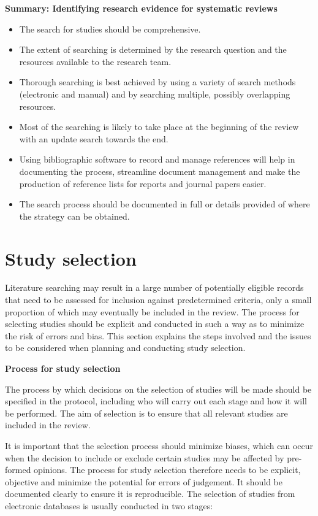 \documentclass[
  10pt,
  a4paper,
  DIV=11,
  numbers=noendperiod]{scrreprt}
\begin{document}
\textbf{Summary: Identifying research evidence for systematic reviews}

\begin{itemize}
\item
  The search for studies should be comprehensive.
\item
  The extent of searching is determined by the research question and the
  resources available to the research team.
\item
  Thorough searching is best achieved by using a variety of search
  methods (electronic and manual) and by searching multiple, possibly
  overlapping resources.
\item
  Most of the searching is likely to take place at the beginning of the
  review with an update search towards the end.
\item
  Using bibliographic software to record and manage references will help
  in documenting the process, streamline document management and make
  the production of reference lists for reports and journal papers
  easier.
\item
  The search process should be documented in full or details provided of
  where the strategy can be obtained.
\end{itemize}

\section{Study selection}\label{study-selection-1}

Literature searching may result in a large number of potentially
eligible records that need to be assessed for inclusion against
predetermined criteria, only a small proportion of which may eventually
be included in the review. The process for selecting studies should be
explicit and conducted in such a way as to minimize the risk of errors
and bias. This section explains the steps involved and the issues to be
considered when planning and conducting study selection.

\textbf{Process for study selection}

The process by which decisions on the selection of studies will be made
should be specified in the protocol, including who will carry out each
stage and how it will be performed. The aim of selection is to ensure
that all relevant studies are included in the review.

It is important that the selection process should minimize biases, which
can occur when the decision to include or exclude certain studies may be
affected by pre-formed opinions. The process for study selection
therefore needs to be explicit, objective and minimize the potential for
errors of judgement. It should be documented clearly to ensure it is
reproducible. The selection of studies from electronic databases is
usually conducted in two stages:
\end{document}

